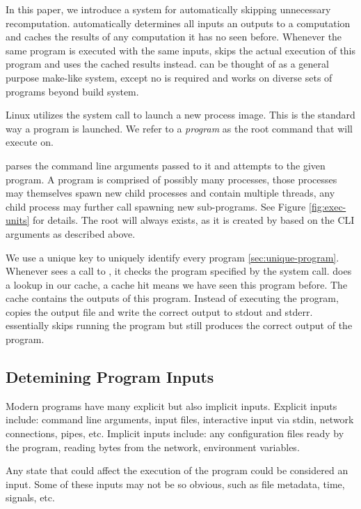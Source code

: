 In this paper, we introduce \pc a system for automatically skipping unnecessary recomputation. \pc automatically determines all inputs an outputs to a computation and caches the results of any computation it has no seen before. Whenever the same program is executed with the same inputs, \pc skips the actual execution of this program and uses the cached results instead. \pc can be thought of as a general purpose make-like system, except no  is required and works on diverse sets of programs beyond build system. 
 
Linux utilizes the  system call to launch a new process image. This is the standard way
a program is launched. We refer to a \textit{program} as the root command that \pc will execute on.

\pc parses the command line arguments passed to it and attempts to  the given program.
A program is comprised of possibly many processes, those processes may themselves spawn new child processes and contain multiple threads, any child process may further call  spawning new sub-programs. See Figure \ref{fig:exec-units} for details. The root \cacheunit{} will always exists, as it is created by \pc based on the CLI arguments as
described above.

We use a unique key to uniquely identify every program \ref{sec:unique-program}. Whenever \pc sees a call to
, it checks the program specified by the system call. \pc does a lookup in our cache, a cache hit means we have seen this program before. The cache contains the outputs of this program. Instead of executing
the program, \pc copies the output file and write the correct output to stdout and stderr. \pc essentially skips running the program but still produces the correct output of the program.

\subsection{Detemining Program Inputs}
Modern programs have many explicit but also implicit inputs. Explicit inputs include: command line arguments,
input files, interactive input via stdin, network connections, pipes, etc. Implicit inputs include: any configuration files ready by the program, reading bytes from the network, environment variables.

Any state that could affect the execution of the program could be considered an input. Some of these inputs
may not be so obvious, such as file metadata, time, signals, etc.

